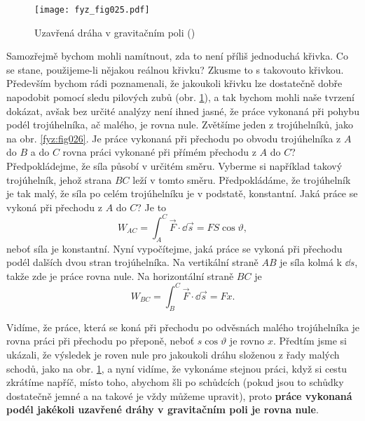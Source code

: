     \begin{figure}[ht!]  %
      \centering
      \texttt{[image: fyz\_fig025.pdf]}
      \caption{Uzavřená dráha v gravitačním poli (\cite[s.~190]{Feynman01})}
      \label{fyz:fig025}
    \end{figure}
    Samozřejmě bychom mohli namítnout, zda to není příliš jednoduchá křivka. Co se stane, 
    použijeme-li nějakou reálnou křivku? Zkusme to s takovouto křivkou. Především bychom rádi 
    poznamenali, že jakoukoli křivku lze dostatečně dobře napodobit pomocí sledu pilových zubů 
    (obr. \ref{fyz:fig025}), a tak bychom mohli naše tvrzení dokázat, avšak bez určité analýzy není 
    ihned jasné, že práce vykonaná při pohybu podél trojúhelníka, ač malého, je rovna nule. 
    Zvětšíme jeden z trojúhelníků, jako na obr. \ref{fyz:fig026}. Je práce vykonaná při přechodu po 
    obvodu trojúhelníka z \(A\) do \(B\) a do \(C\) rovna práci vykonané při přímém přechodu z 
    \(A\) do \(C\)? Předpokládejme, že síla působí v určitém směru. Vyberme si například takový 
    trojúhelník, jehož strana \(BC\) leží v tomto směru. Předpokládáme, že trojúhelník je tak malý, 
    že síla po celém trojúhelníku je v podstatě, konstantní. Jaká práce se vykoná při přechodu z 
    \(A\) do \(C\)? Je to
    \begin{equation*}
      W_{AC} = \int_A^C\vec{F}\cdot\dd{\vec{s}} = FS\cos\vartheta,
    \end{equation*} 
    neboť síla je konstantní. Nyní vypočítejme, jaká práce se vykoná při přechodu podél dalších 
    dvou stran trojúhelníka. Na vertikální straně \(AB\) je síla kolmá k \(\dd{s}\), takže zde je 
    práce rovna nule. Na horizontální straně \(BC\) je
    \begin{equation}\label{FYZ:eq044}
      W_{BC} = \int_B^C\vec{F}\cdot\dd{\vec{s}} = Fx.
    \end{equation} 

    Vidíme, že práce, která se koná při přechodu po odvěsnách malého trojúhelníka je rovna práci 
    při přechodu po přeponě, neboť \(s\cos\vartheta\) je rovno \(x\). Předtím jsme si ukázali, že 
    výsledek je roven nule pro jakoukoli dráhu složenou z řady malých schodů, jako na obr. 
    \ref{fyz:fig025}, a nyní vidíme, že vykonáme stejnou práci, když si cestu zkrátíme napříč, 
    místo toho, abychom šli po schůdcích (pokud jsou to schůdky dostatečně jemné a na takové je 
    vždy můžeme upravit), proto \textbf{práce vykonaná podél jakékoli uzavřené dráhy v gravitačním 
    poli je rovna nule}.
    
